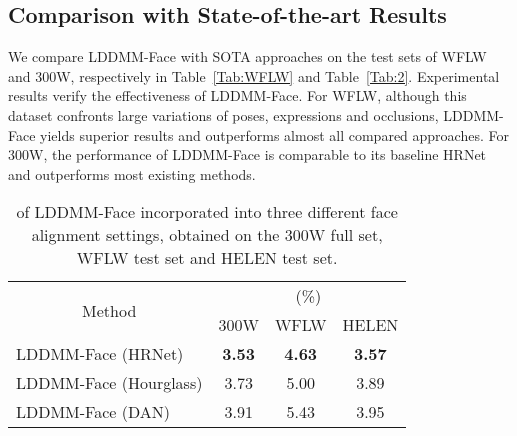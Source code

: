 \documentclass[10pt,twocolumn,letterpaper]{article}
\begin{document}
\subsection{Comparison with State-of-the-art Results}\label{comparison}
We compare LDDMM-Face with SOTA approaches on the test sets of WFLW and 300W, respectively in Table~\ref{Tab:WFLW} and Table~\ref{Tab:2}. Experimental results verify the effectiveness of LDDMM-Face. For WFLW, although this dataset confronts large variations of poses, expressions and occlusions, LDDMM-Face yields superior results and outperforms almost all compared approaches. For 300W, the performance of LDDMM-Face is comparable to its baseline HRNet and outperforms most existing methods.


\begin{table}[h!]
\renewcommand\arraystretch{1.1}
\center
\small
\begin{tabular}{@{}cccc@{}}
\toprule
\multirow{2}{*}{Method} & \multicolumn{3}{c}{(\%)} \\ \cmidrule(l){2-4} 
 & \multicolumn{1}{c}{300W} & \multicolumn{1}{c}{WFLW} & \multicolumn{1}{c}{HELEN} \\ \midrule
\multicolumn{1}{l}{LDDMM-Face (HRNet)} & \textbf{3.53} & \textbf{4.63} & \multicolumn{1}{c}{\textbf{3.57}} \\
\multicolumn{1}{l}{LDDMM-Face (Hourglass)} & 3.73 & 5.00 & \multicolumn{1}{c}{3.89} \\
\multicolumn{1}{l}{LDDMM-Face (DAN)} & 3.91 & 5.43 & \multicolumn{1}{c}{3.95} \\ \bottomrule
\end{tabular}\caption{ of LDDMM-Face incorporated into three different face alignment settings, obtained on the 300W full set, WFLW test set and HELEN test set.}
\label{Tab:1}
\vspace{-2mm}
\end{table}
\end{document}
